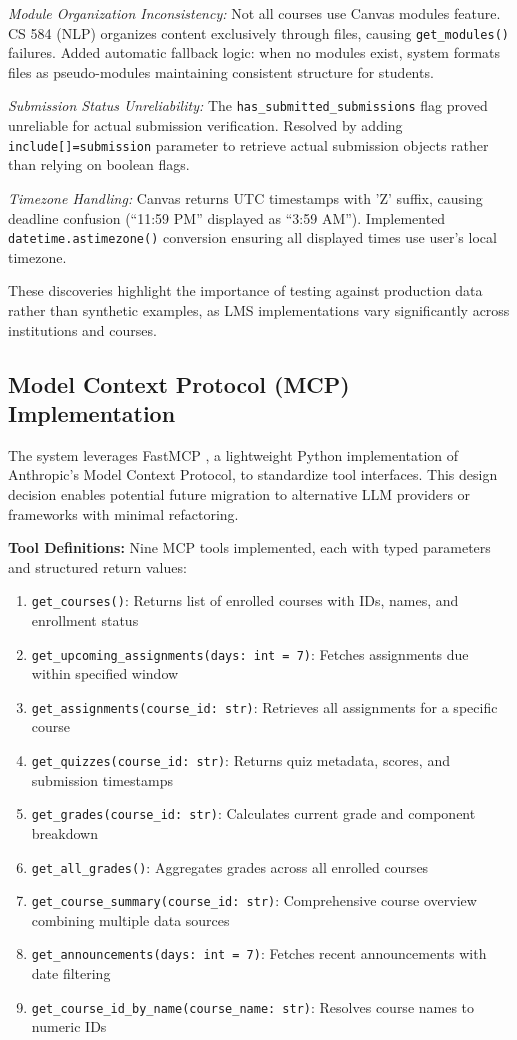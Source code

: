 \documentclass{article}
\begin{document}
\textit{Module Organization Inconsistency:} Not all courses use Canvas modules feature. CS 584 (NLP) organizes content exclusively through files, causing \texttt{get\_modules()} failures. Added automatic fallback logic: when no modules exist, system formats files as pseudo-modules maintaining consistent structure for students.

\textit{Submission Status Unreliability:} The \texttt{has\_submitted\_submissions} flag proved unreliable for actual submission verification. Resolved by adding \texttt{include[]=submission} parameter to retrieve actual submission objects rather than relying on boolean flags.

\textit{Timezone Handling:} Canvas returns UTC timestamps with 'Z' suffix, causing deadline confusion (``11:59 PM'' displayed as ``3:59 AM''). Implemented \texttt{datetime.astimezone()} conversion ensuring all displayed times use user's local timezone.

These discoveries highlight the importance of testing against production data rather than synthetic examples, as LMS implementations vary significantly across institutions and courses.


\subsection{Model Context Protocol (MCP) Implementation}

The system leverages FastMCP \cite{mcp2025landscape}, a lightweight Python implementation of Anthropic's Model Context Protocol, to standardize tool interfaces. This design decision enables potential future migration to alternative LLM providers or frameworks with minimal refactoring.

\textbf{Tool Definitions:} Nine MCP tools implemented, each with typed parameters and structured return values:

\begin{enumerate}
    \item \texttt{get\_courses()}: Returns list of enrolled courses with IDs, names, and enrollment status
    \item \texttt{get\_upcoming\_assignments(days: int = 7)}: Fetches assignments due within specified window
    \item \texttt{get\_assignments(course\_id: str)}: Retrieves all assignments for a specific course
    \item \texttt{get\_quizzes(course\_id: str)}: Returns quiz metadata, scores, and submission timestamps
    \item \texttt{get\_grades(course\_id: str)}: Calculates current grade and component breakdown
    \item \texttt{get\_all\_grades()}: Aggregates grades across all enrolled courses
    \item \texttt{get\_course\_summary(course\_id: str)}: Comprehensive course overview combining multiple data sources
    \item \texttt{get\_announcements(days: int = 7)}: Fetches recent announcements with date filtering
    \item \texttt{get\_course\_id\_by\_name(course\_name: str)}: Resolves course names to numeric IDs
\end{enumerate}
\end{document}
